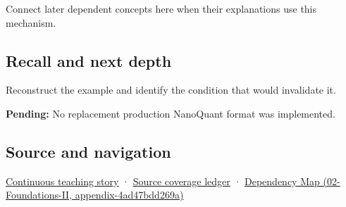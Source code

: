 Connect later dependent concepts here when their explanations use this mechanism.

\subsection{Recall and next depth}\label{recall-and-next-depth}

Reconstruct the example and identify the condition that would invalidate it.

\textbf{Pending:} No replacement production NanoQuant format was implemented.

\subsection{Source and navigation}\label{source-and-navigation}

\href{Continuous\%20Notes/Computing\%20Foundations\%20-\%20From\%20Bits\%20to\%20C++\%20and\%20Systems\%20APIs\#Bytes\%20become\%20a\%20durable\%20agreement}{Continuous teaching story} · \hyperref[appendix-fd090d982a15]{Source coverage ledger} · \href{}{Dependency Map (02-Foundations-II, appendix-4ad47bdd269a)}
